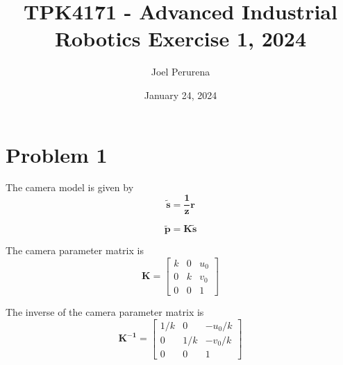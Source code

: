 \documentclass[12pt, letterpaper]{article}
\title{\textbf{\Large TPK4171 - Advanced Industrial Robotics Exercise 1, 2024}}
\author{Joel Perurena}
\date{January 24, 2024}
\begin{document}
\maketitle
\section*{\large Problem 1}
The camera model is given by
\begin{equation}
    \bm{\tilde{s}=\frac{1}{z}r} \label{eq:normalized image coordinate}
\end{equation}

\begin{equation}
    \bm{\tilde{p}=K\tilde{s}} \label{eq:pixel coordinate}
\end{equation}

The camera parameter matrix is
\begin{equation}
    \bm{K}=\begin{bmatrix}
            k & 0 & u_0\\
            0 & k & v_0\\
            0 & 0 & 1
            \end{bmatrix} \label{eq:camera parameter matrix}
\end{equation}

The inverse of the camera parameter matrix is
\begin{equation}
    \bm{K^{-1}}=\begin{bmatrix}
            1/k & 0 & -u_0/k\\
            0 & 1/k & -v_0/k\\
            0 & 0 & 1
            \end{bmatrix} \label{eq:inverse camera parameter matrix}
\end{equation}
\end{document}
